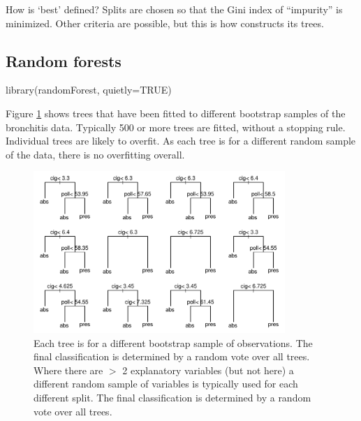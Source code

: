 How is `best' defined? Splits are chosen so that the Gini index of
``impurity'' is minimized.  Other criteria are possible, but this is
how  constructs its trees.

\subsection{Random forests}\label{ss:rf}

\begin{Schunk}
\begin{Sinput}
library(randomForest, quietly=TRUE)
\end{Sinput}
\end{Schunk}

Figure \ref{fig:brontrees} shows trees that have been fitted to
different bootstrap samples of the bronchitis data.  Typically 500 or
more trees are fitted, without a stopping rule.  Individual trees are
likely to overfit.  As each tree is for a different random sample of
the data, there is no overfitting overall.

\begin{figure}
\begin{Schunk}


\centerline{\includegraphics[width=0.85\textwidth]{figs/9-rf-x-bronchit-1} }

\end{Schunk}
\caption{Each tree is for a different bootstrap sample of
  observations.  The final classification is determined by a random
  vote over all trees.  Where there are $>$ 2 explanatory variables
  (but not here) a different random sample of variables is typically
  used for each different split. The final classification is
  determined by a random vote over all trees.}\label{fig:brontrees}
\end{figure}

